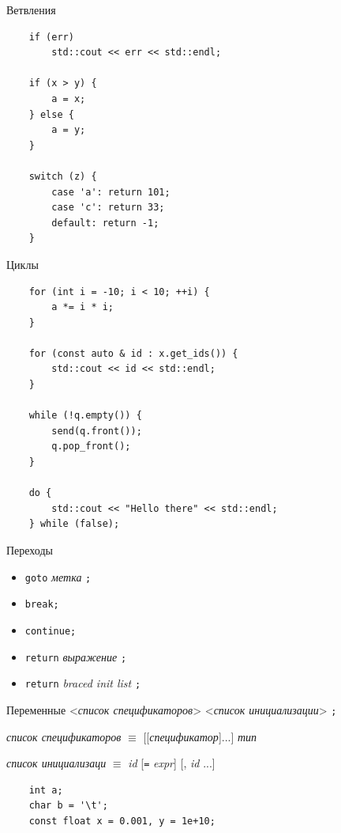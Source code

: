 \documentclass[unknownkeysallowed,xcolor=table]{beamer}
\begin{document}
\begin{frame}[fragile]{Ветвления}
  \begin{lstlisting}
    if (err)
        std::cout << err << std::endl;

    if (x > y) {
        a = x;
    } else {
        a = y;
    }

    switch (z) {
        case 'a': return 101;
        case 'c': return 33;
        default: return -1;
    }
  \end{lstlisting}
\end{frame}

\begin{frame}[fragile]{Циклы}
  \begin{lstlisting}
    for (int i = -10; i < 10; ++i) {
        a *= i * i;
    }

    for (const auto & id : x.get_ids()) {
        std::cout << id << std::endl;
    }

    while (!q.empty()) {
        send(q.front());
        q.pop_front();
    }

    do {
        std::cout << "Hello there" << std::endl;
    } while (false);
  \end{lstlisting}
\end{frame}

\begin{frame}[fragile]{Переходы}
  \begin{itemize}
    \item \lstinline{goto} \emph{метка} \lstinline{;} \vspace{1em}
    \item \lstinline{break;} \vspace{1em}
    \item \lstinline{continue;} \vspace{1em}
    \item \lstinline{return} \emph{выражение} \lstinline{;} \vspace{1em}
    \item \lstinline{return} \emph{braced init list} \lstinline{;}
  \end{itemize}
\end{frame}

\begin{frame}[fragile]{Переменные}
  <\emph{список спецификаторов}> <\emph{список инициализации}> \lstinline{;}

  \vspace{1.5em}

  \emph{список спецификаторов} $\equiv$ [[\emph{спецификатор}]...] \emph{тип}

  \vspace{1.5em}

  \emph{список инициализаци} $\equiv$ \emph{id} [\lstinline{=} \emph{expr}] [, \emph{id} ...]

  \vspace{2em}

  \begin{lstlisting}
    int a;
    char b = '\t';
    const float x = 0.001, y = 1e+10;
  \end{lstlisting}
\end{frame}
\end{document}
